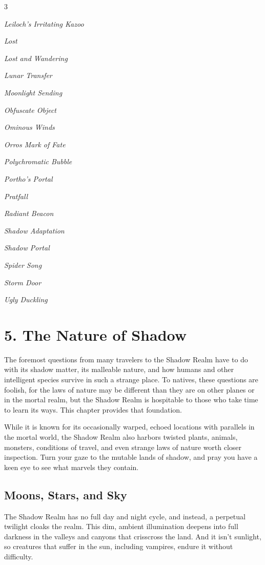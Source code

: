 \documentclass[10pt,a4paper,twoside,bg=print,twocolumn,openany,nodeprecatedcode]{dndbook}
\begin{document}
\begin{itemize}
\begin{multicols}{3}
\item \textit{Leiloch's Irritating Kazoo}
\item \textit{Lost}
\item \textit{Lost and Wandering}
\item \textit{Lunar Transfer}
\item \textit{Moonlight Sending}
\item \textit{Obfuscate Object}
\item \textit{Ominous Winds}
\item \textit{Orros Mark of Fate}
\item \textit{Polychromatic Bubble}
\item \textit{Portho's Portal}
\item \textit{Pratfall}
\item \textit{Radiant Beacon}
\item \textit{Shadow Adaptation}
\item \textit{Shadow Portal}
\item \textit{Spider Song}
\item \textit{Storm Door}
\item \textit{Ugly Duckling}
\end{multicols}

\end{itemize}

\chapter{5. The Nature of Shadow}
The foremost questions from many travelers to the Shadow Realm have to do with its shadow matter, its malleable nature, and how humans and other intelligent species survive in such a strange place. To natives, these questions are foolish, for the laws of nature may be different than they are on other planes or in the mortal realm, but the Shadow Realm is hospitable to those who take time to learn its ways. This chapter provides that foundation.

While it is known for its occasionally warped, echoed locations with parallels in the mortal world, the Shadow Realm also harbors twisted plants, animals, monsters, conditions of travel, and even strange laws of nature worth closer inspection. Turn your gaze to the mutable lands of shadow, and pray you have a keen eye to see what marvels they contain.

\section{Moons, Stars, and Sky}
The Shadow Realm has no full day and night cycle, and instead, a perpetual twilight cloaks the realm. This dim, ambient illumination deepens into full darkness in the valleys and canyons that crisscross the land. And it isn't sunlight, so creatures that suffer in the sun, including vampires, endure it without difficulty.
\end{document}
